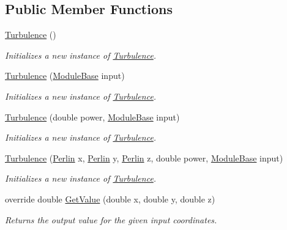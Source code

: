 \subsection*{Public Member Functions}
\begin{DoxyCompactItemize}
\item 
\hyperlink{class_lib_noise_1_1_operator_1_1_turbulence_a6e3b317e7a5db21ab409ec76c9100e88}{Turbulence} ()
\begin{DoxyCompactList}\small\item\em Initializes a new instance of \hyperlink{class_lib_noise_1_1_operator_1_1_turbulence}{Turbulence}. \end{DoxyCompactList}\item 
\hyperlink{class_lib_noise_1_1_operator_1_1_turbulence_adebaad80f53e18ef1371ef0bf1e11d1d}{Turbulence} (\hyperlink{class_lib_noise_1_1_module_base}{Module\+Base} input)
\begin{DoxyCompactList}\small\item\em Initializes a new instance of \hyperlink{class_lib_noise_1_1_operator_1_1_turbulence}{Turbulence}. \end{DoxyCompactList}\item 
\hyperlink{class_lib_noise_1_1_operator_1_1_turbulence_a495df95b79f6f4be7d7f670e53a52988}{Turbulence} (double power, \hyperlink{class_lib_noise_1_1_module_base}{Module\+Base} input)
\begin{DoxyCompactList}\small\item\em Initializes a new instance of \hyperlink{class_lib_noise_1_1_operator_1_1_turbulence}{Turbulence}. \end{DoxyCompactList}\item 
\hyperlink{class_lib_noise_1_1_operator_1_1_turbulence_abe249983d6ab905ef8a165c63d24afae}{Turbulence} (\hyperlink{class_lib_noise_1_1_generator_1_1_perlin}{Perlin} x, \hyperlink{class_lib_noise_1_1_generator_1_1_perlin}{Perlin} y, \hyperlink{class_lib_noise_1_1_generator_1_1_perlin}{Perlin} z, double power, \hyperlink{class_lib_noise_1_1_module_base}{Module\+Base} input)
\begin{DoxyCompactList}\small\item\em Initializes a new instance of \hyperlink{class_lib_noise_1_1_operator_1_1_turbulence}{Turbulence}. \end{DoxyCompactList}\item 
override double \hyperlink{class_lib_noise_1_1_operator_1_1_turbulence_af729e56ef63cc48cd7e85f75d15dc717}{Get\+Value} (double x, double y, double z)
\begin{DoxyCompactList}\small\item\em Returns the output value for the given input coordinates. \end{DoxyCompactList}\end{DoxyCompactItemize}
